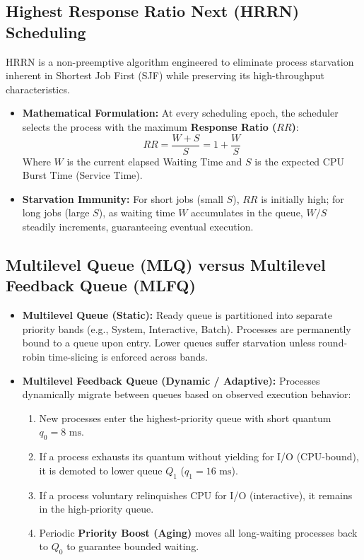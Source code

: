 \subsection{Highest Response Ratio Next (HRRN) Scheduling}
HRRN is a non-preemptive algorithm engineered to eliminate process starvation inherent in Shortest Job First (SJF) while preserving its high-throughput characteristics.
\begin{itemize}
    \item \textbf{Mathematical Formulation:} At every scheduling epoch, the scheduler selects the process with the maximum \textbf{Response Ratio ($RR$)}:
    \begin{equation}
    \boxed{RR = \frac{W + S}{S} = 1 + \frac{W}{S}}
    \end{equation}
    Where $W$ is the current elapsed Waiting Time and $S$ is the expected CPU Burst Time (Service Time).
    \item \textbf{Starvation Immunity:} For short jobs (small $S$), $RR$ is initially high; for long jobs (large $S$), as waiting time $W$ accumulates in the queue, $W/S$ steadily increments, guaranteeing eventual execution.
\end{itemize}

\subsection{Multilevel Queue (MLQ) versus Multilevel Feedback Queue (MLFQ)}
\begin{itemize}
    \item \textbf{Multilevel Queue (Static):} Ready queue is partitioned into separate priority bands (e.g., System, Interactive, Batch). Processes are permanently bound to a queue upon entry. Lower queues suffer starvation unless round-robin time-slicing is enforced across bands.
    \item \textbf{Multilevel Feedback Queue (Dynamic / Adaptive):} Processes dynamically migrate between queues based on observed execution behavior:
    \begin{enumerate}
        \item New processes enter the highest-priority queue with short quantum $q_0 = 8\text{ ms}$.
        \item If a process exhausts its quantum without yielding for I/O (CPU-bound), it is demoted to lower queue $Q_1$ ($q_1 = 16\text{ ms}$).
        \item If a process voluntary relinquishes CPU for I/O (interactive), it remains in the high-priority queue.
        \item Periodic \textbf{Priority Boost (Aging)} moves all long-waiting processes back to $Q_0$ to guarantee bounded waiting.
    \end{enumerate}
\end{itemize}

